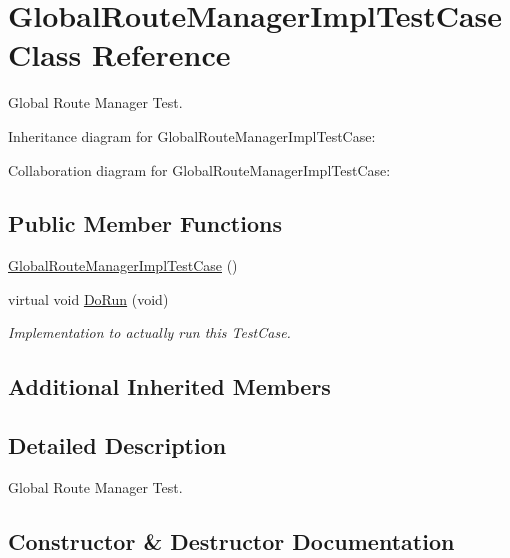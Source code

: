 \hypertarget{classGlobalRouteManagerImplTestCase}{}\section{Global\+Route\+Manager\+Impl\+Test\+Case Class Reference}
\label{classGlobalRouteManagerImplTestCase}


Global Route Manager Test.  




Inheritance diagram for Global\+Route\+Manager\+Impl\+Test\+Case\+:


Collaboration diagram for Global\+Route\+Manager\+Impl\+Test\+Case\+:
\subsection*{Public Member Functions}
\begin{DoxyCompactItemize}
\item 
\hyperlink{classGlobalRouteManagerImplTestCase_a70e31f146aeb56af61902bc017e438f2}{Global\+Route\+Manager\+Impl\+Test\+Case} ()
\item 
virtual void \hyperlink{classGlobalRouteManagerImplTestCase_aed56fd8ecbd7ecaa5473b9793d0befc1}{Do\+Run} (void)
\begin{DoxyCompactList}\small\item\em Implementation to actually run this Test\+Case. \end{DoxyCompactList}\end{DoxyCompactItemize}
\subsection*{Additional Inherited Members}


\subsection{Detailed Description}
Global Route Manager Test. 

\subsection{Constructor \& Destructor Documentation}
